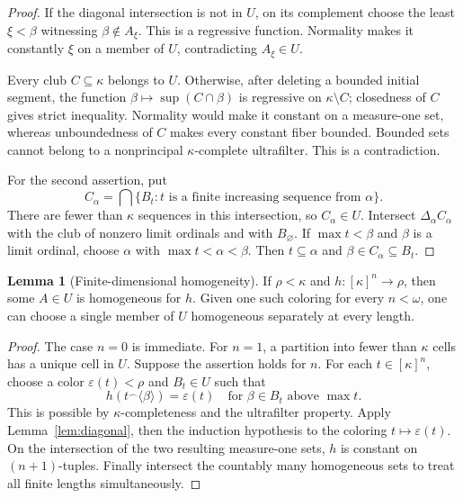\documentclass[11pt,letterpaper]{article}
\theoremstyle{definition}
\newtheorem{lemma}[definition]{Lemma}
\numberwithin{equation}{section}
\newcommand{\concat}{\mathbin{{}^{\frown}}}
\begin{document}
\begin{proof}
If the diagonal intersection is not in $U$, on its complement choose the least $\xi<\beta$ witnessing $\beta\notin A_\xi$. This is a regressive function. Normality makes it constantly $\xi$ on a member of $U$, contradicting $A_\xi\in U$.

Every club $C\subseteq\kappa$ belongs to $U$. Otherwise, after deleting a bounded initial segment, the function $\beta\mapsto\sup(C\cap\beta)$ is regressive on $\kappa\setminus C$; closedness of $C$ gives strict inequality. Normality would make it constant on a measure-one set, whereas unboundedness of $C$ makes every constant fiber bounded. Bounded sets cannot belong to a nonprincipal $\kappa$-complete ultrafilter. This is a contradiction.

For the second assertion, put
\[
 C_\alpha=\bigcap\{B_t:t\text{ is a finite increasing sequence from }\alpha\}.
\]
There are fewer than $\kappa$ sequences in this intersection, so $C_\alpha\in U$. Intersect $\Delta_\alpha C_\alpha$ with the club of nonzero limit ordinals and with $B_\varnothing$. If $\max t<\beta$ and $\beta$ is a limit ordinal, choose $\alpha$ with $\max t<\alpha<\beta$. Then $t\subseteq\alpha$ and $\beta\in C_\alpha\subseteq B_t$.
\end{proof}

\begin{lemma}[Finite-dimensional homogeneity]\label{lem:ramsey}
If $\rho<\kappa$ and $h:[\kappa]^n\to\rho$, then some $A\in U$ is homogeneous for $h$. Given one such coloring for every $n<\omega$, one can choose a single member of $U$ homogeneous separately at every length.
\end{lemma}

\begin{proof}
The case $n=0$ is immediate. For $n=1$, a partition into fewer than $\kappa$ cells has a unique cell in $U$. Suppose the assertion holds for $n$. For each $t\in[\kappa]^n$, choose a color $\varepsilon(t)<\rho$ and $B_t\in U$ such that
\[
 h(t\concat\langle\beta\rangle)=\varepsilon(t)
 \quad\text{for }\beta\in B_t\text{ above }\max t.
\]
This is possible by $\kappa$-completeness and the ultrafilter property. Apply Lemma~\ref{lem:diagonal}, then the induction hypothesis to the coloring $t\mapsto\varepsilon(t)$. On the intersection of the two resulting measure-one sets, $h$ is constant on $(n+1)$-tuples. Finally intersect the countably many homogeneous sets to treat all finite lengths simultaneously.
\end{proof}
\end{document}

